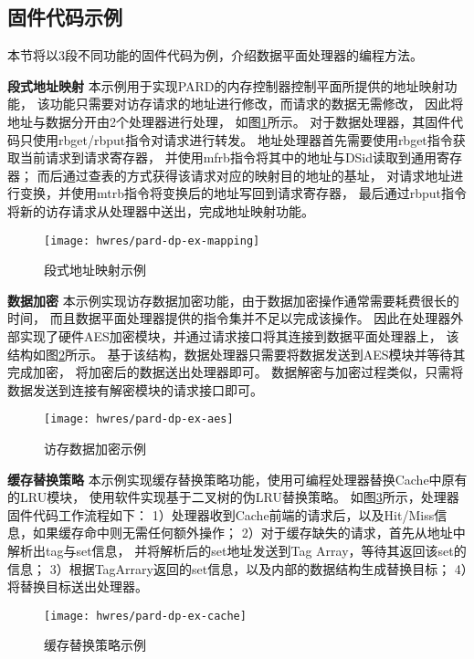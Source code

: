 \subsection{固件代码示例}
本节将以3段不同功能的固件代码为例，介绍数据平面处理器的编程方法。

\textbf{段式地址映射}\quad
本示例用于实现PARD的内存控制器控制平面所提供的地址映射功能，
该功能只需要对访存请求的地址进行修改，而请求的数据无需修改，
因此将地址与数据分开由2个处理器进行处理，
如图\ref{fig:pard-dp-ex-mapping}所示。
对于数据处理器，其固件代码只使用rbget/rbput指令对请求进行转发。
地址处理器首先需要使用rbget指令获取当前请求到请求寄存器，
并使用mfrb指令将其中的地址与DSid读取到通用寄存器；
而后通过查表的方式获得该请求对应的映射目的地址的基址，
对请求地址进行变换，并使用mtrb指令将变换后的地址写回到请求寄存器，
最后通过rbput指令将新的访存请求从处理器中送出，完成地址映射功能。

\begin{figure}[H]
  \centering
  \texttt{[image: hwres/pard-dp-ex-mapping]}
  \caption{段式地址映射示例}
  \label{fig:pard-dp-ex-mapping}
\end{figure}
 
\textbf{数据加密}\quad
本示例实现访存数据加密功能，由于数据加密操作通常需要耗费很长的时间，
而且数据平面处理器提供的指令集并不足以完成该操作。
因此在处理器外部实现了硬件AES加密模块，并通过请求接口将其连接到数据平面处理器上，
该结构如图\ref{fig:pard-dp-ex-aes}所示。
基于该结构，数据处理器只需要将数据发送到AES模块并等待其完成加密，
将加密后的数据送出处理器即可。
数据解密与加密过程类似，只需将数据发送到连接有解密模块的请求接口即可。

\begin{figure}[H]
  \centering
  \texttt{[image: hwres/pard-dp-ex-aes]}
  \caption{访存数据加密示例}
  \label{fig:pard-dp-ex-aes}
\end{figure}
 
\textbf{缓存替换策略}\quad
本示例实现缓存替换策略功能，使用可编程处理器替换Cache中原有的LRU模块，
使用软件实现基于二叉树的伪LRU替换策略。
如图\ref{fig:pard-dp-ex-cache}所示，处理器固件代码工作流程如下：
1）处理器收到Cache前端的请求后，以及Hit/Miss信息，如果缓存命中则无需任何额外操作；
2）对于缓存缺失的请求，首先从地址中解析出tag与set信息，
并将解析后的set地址发送到Tag Array，等待其返回该set的信息；
3）根据TagArrary返回的set信息，以及内部的数据结构生成替换目标；
4）将替换目标送出处理器。

\begin{figure}[H]
  \centering
  \texttt{[image: hwres/pard-dp-ex-cache]}
  \caption{缓存替换策略示例}
  \label{fig:pard-dp-ex-cache}
\end{figure}


